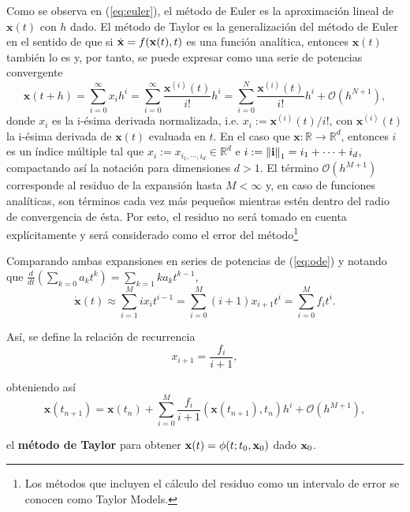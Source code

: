 Como se observa en (\ref{eq:euler}), el método de Euler es la aproximación lineal de $\mathbf{x}(t)$ con $h$ dado. El método de Taylor es la generalización del método de Euler en el sentido de que si $\dot{\mathbf{x}} = f(\mathbf{x}(t),t)$ es una función analítica, entonces $\mathbf{x}(t)$ también lo es y, por tanto, se puede expresar como una serie de potencias convergente 
\begin{equation}
\mathbf{x}(t + h) = \sum_{i=0}^\infty x_i h^i = \sum_{i=0}^\infty \frac{\mathbf{x}^{(i)}(t)}{i!}h^i 
= \sum_{i=0}^N \frac{\mathbf{x}^{(i)}(t)}{i!}h^i + \mathcal{O}(h^{N+1}),
\label{eq:anal-exp}
\end{equation}
donde $x_i$ es la i-ésima derivada normalizada, i.e. $x_i  := \mathbf{x}^{(i)}(t)/i! $, con $\mathbf{x}^{(i)}(t)$ la i-ésima derivada de $\mathbf{x}(t)$ evaluada en $t$. En el caso que $\mathbf{x}: \mathbb{R} \to \mathbb{R}^d$, entonces $i$ es un índice múltiple tal que $x_i := x_{i_1,\cdots,i_d} \in \mathbb{R}^d$ e $i :=\left\lVert\mathbf{i}\right\rVert_1 = i_1 + \cdots + i_d$, compactando así la notación para dimensiones $d > 1$. El término $\mathcal{O}(h^{M+1})$ corresponde al residuo de la expansión hasta $M < \infty$ y, en caso de funciones analíticas, son términos cada vez más pequeños mientras estén dentro del radio de convergencia de ésta. Por esto, el residuo no será tomado en cuenta explícitamente y será considerado como el error del método\footnote{Los métodos que incluyen el cálculo del residuo como un intervalo de error se conocen como Taylor Models.}

Comparando ambas expansiones en series de potencias de (\ref{eq:ode}) y notando que $ \frac{d}{dt} \left( \sum_{k=0} a_k t^k \right) = \sum_{k=1} k a_k t^{k-1}$,   
\begin{equation*}
 \dot{\mathbf{x}}(t) \approx \sum_{i=1}^M i x_i t^{i-1} = \sum_{i=0}^M (i+1)x_{i+1} t^i = \sum_{i=0}^M f_i t^i.
\end{equation*}

Así, se define la relación de recurrencia
\begin{equation}
x_{i+1} = \frac{f_i}{i+1},
\label{eq:rec-rel}
\end{equation}

obteniendo así 
\begin{equation}
\mathbf{x}(t_{n+1}) = \mathbf{x}(t_n) + \sum_{i=0}^M \frac{f_i}{i+1} \left(\mathbf{x}(t_{n+1}),t_n \right) h^i + \mathcal{O}(h^{M+1}),
\label{eq:taylor-rel}
\end{equation}

el \textbf{método de Taylor} para obtener $\mathbf{x}(t) = \phi(t;t_0,\mathbf{x}_0)$ dado $\mathbf{x}_0$.

